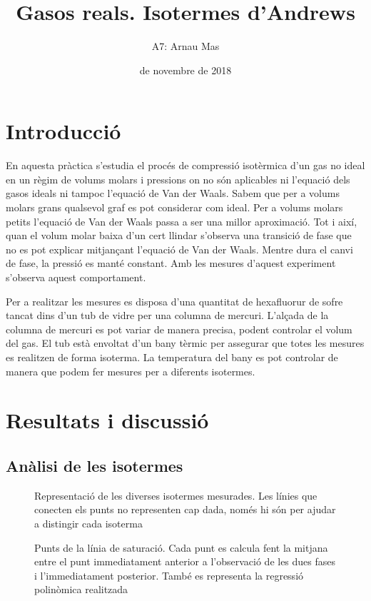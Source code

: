 \documentclass[12pt]{article}
\title{\sffamily {\bfseries Informe IV:} Gasos reals. Isotermes d'Andrews}
\author{\sffamily A7: Arnau Mas}
\date{\sffamily 12 de novembre de 2018}
\numberwithin{table}{section}
\numberwithin{figure}{section}
\numberwithin{equation}{section}
\begin{document}
\maketitle
\section{Introducció}
En aquesta pràctica s'estudia el procés de compressió isotèrmica d'un gas no ideal en un règim de volums molars i pressions on no són aplicables ni l'equació dels gasos ideals ni tampoc l'equació de Van der Waals. Sabem que per a volums molars grans qualsevol graf es pot considerar com ideal. Per a volums molars petits l'equació de Van der Waals passa a ser una millor aproximació. Tot i així, quan el volum molar baixa d'un cert llindar s'observa una transició de fase que no es pot explicar mitjançant l'equació de Van der Waals. Mentre dura el canvi de fase, la pressió es manté constant. Amb les mesures d'aquest experiment s'observa aquest comportament.    

Per a realitzar les mesures es disposa d'una quantitat de hexafluorur de sofre tancat dins d'un tub de vidre per una columna de mercuri. L'alçada de la columna de mercuri es pot variar de manera precisa, podent controlar el volum del gas. El tub està envoltat d'un bany tèrmic per assegurar que totes les mesures es realitzen de forma isoterma. La temperatura del bany es pot controlar de manera que podem fer mesures per a diferents isotermes. 

\section{Resultats i discussió}
\subsection{Anàlisi de les isotermes}
\begin{figure}[htb]
	\small \sffamily \centering
	
	\caption{Representació de les diverses isotermes mesurades. Les línies que conecten els punts no representen cap dada, només hi són per ajudar a distingir cada isoterma}
	\label{fig:isotermes}
\end{figure}

\begin{figure}[htb]
	\small \sffamily \centering
	
	\caption{Punts de la línia de saturació. Cada punt es calcula fent la mitjana entre el punt immediatament anterior a l'observació de les dues fases i l'immediatament posterior. També es representa la regressió polinòmica realitzada}
	\label{fig:saturacio}
\end{figure}
\end{document}
